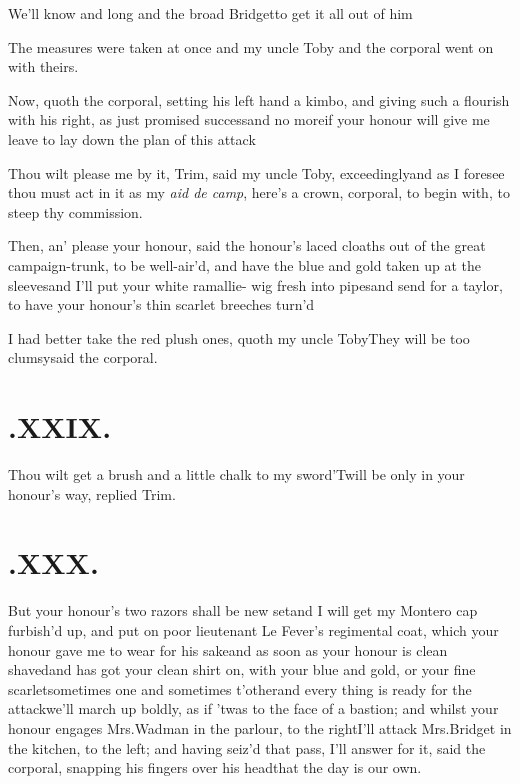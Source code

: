 \documentclass[twoside]{article}
\begin{document}
\tsk We’ll know and long and the broad
Bridget\tsk to get it all out of him\tsh

The measures were taken at once\tsh\break
and my uncle Toby and the corporal\break 
went on with theirs.\etp

\vfill{}\eject

Now, quoth the corporal, setting his left hand a kimbo, and
giving such a flourish with his right, as just promised
success\tsk and no more\tsh if your honour will give me
leave to lay down the plan of this attack\tsh

\tsh Thou wilt please me by it, Trim, said my
uncle Toby, exceedingly\tsk and as I foresee thou must act
in it as my \textit{aid de camp}, here’s a crown, corporal, to
begin with, to steep thy commission.

Then, an’ please your honour, said the\break
{}
honour’s laced cloaths out of the great campaign-trunk, to be
well-air’d, and have the blue and gold taken up at the
sleeves\tsk and I’ll put your white ramallie-
wig fresh into
pipes\tsk and send for a taylor, to have your honour’s thin
scarlet breeches turn’d\tsh

\tsh I had better take the red plush ones,\break
quoth my uncle Toby\tsk They will be\break
too clumsy\tsk said the corporal.

\section{.\enspace XXIX.}

\quad\tsh Thou wilt get a brush and a little chalk to my
sword\tsh ’Twill be only in your honour’s way,
replied Trim.

\section{.\enspace XXX.}

\quad\tsk But your honour’s two razors shall be new
set\tsk and I will get my Montero cap furbish’d up,
and put on poor lieutenant Le Fever’s regimental coat,
which your honour gave me to
wear for his sake\tsk and as soon as your honour is clean
shaved\tsk and has got your clean shirt on, with your blue and
gold, or your fine scarlet\tsh sometimes one and sometimes
t’other\tsk and every thing is ready for the attack\tsk we’ll
march up boldly, as if ’twas to the face of a bastion; and
whilst your honour engages Mrs.\@  Wadman in the parlour, to the
right\tsh I’ll attack Mrs.\@ Bridget in the kitchen, to the
left; and having seiz’d that pass, I’ll answer for it, said the
corporal, snapping his fingers over his head\break\tsk that the
day is our own.
\end{document}
